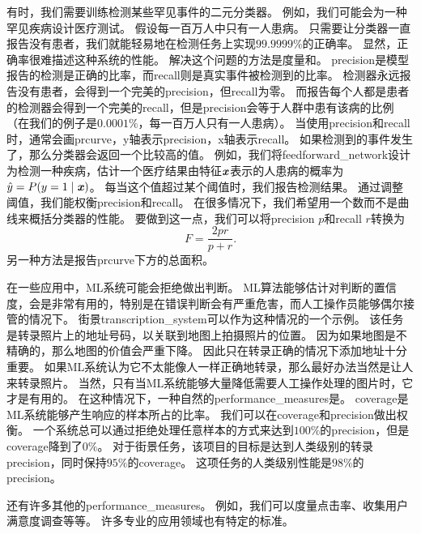 有时，我们需要训练检测某些罕见事件的二元分类器。
例如，我们可能会为一种罕见疾病设计医疗测试。
假设每一百万人中只有一人患病。
只需要让分类器一直报告没有患者，我们就能轻易地在检测任务上实现$99.9999\%$的正确率。
显然，正确率很难描述这种系统的性能。
解决这个问题的方法是度量和。
\gls{precision}是模型报告的检测是正确的比率，而\gls{recall}则是真实事件被检测到的比率。
检测器永远报告没有患者，会得到一个完美的\gls{precision}，但\gls{recall}为零。
而报告每个人都是患者的检测器会得到一个完美的\gls{recall}，但是\gls{precision}会等于人群中患有该病的比例（在我们的例子是$0.0001\%$，每一百万人只有一人患病）。
当使用\gls{precision}和\gls{recall}时，通常会画\gls{prcurve}，y轴表示\gls{precision}，x轴表示\gls{recall}。
如果检测到的事件发生了，那么分类器会返回一个比较高的值。
例如，我们将\gls{feedforward_network}设计为检测一种疾病，估计一个医疗结果由特征$\boldsymbol{\mathit{x}}$表示的人患病的概率为$\hat{y} = P(y=1\mid\boldsymbol{\mathit{x}})$。
每当这个值超过某个阈值时，我们报告检测结果。
通过调整阈值，我们能权衡\gls{precision}和\gls{recall}。
在很多情况下，我们希望用一个数而不是曲线来概括分类器的性能。
要做到这一点，我们可以将\gls{precision} $p$和\gls{recall} $r$转换为
\begin{equation}
	F = \frac{2pr}{p+r}.
\end{equation}
另一种方法是报告\gls{prcurve}下方的总面积。


在一些应用中，\gls{ML}系统可能会拒绝做出判断。
\gls{ML}算法能够估计对判断的置信度，会是非常有用的，特别是在错误判断会有严重危害，而人工操作员能够偶尔接管的情况下。
街景\gls{transcription_system}可以作为这种情况的一个示例。
该任务是转录照片上的地址号码，以关联到地图上拍摄照片的位置。%
因为如果地图是不精确的，那么地图的价值会严重下降。
因此只在转录正确的情况下添加地址十分重要。
如果\gls{ML}系统认为它不太能像人一样正确地转录，那么最好办法当然是让人来转录照片。
当然，只有当\gls{ML}系统能够大量降低需要人工操作处理的图片时，它才是有用的。
在这种情况下，一种自然的\gls{performance_measures}是。
\gls{coverage}是\gls{ML}系统能够产生响应的样本所占的比率。
我们可以在\gls{coverage}和\gls{precision}做出权衡。
一个系统总可以通过拒绝处理任意样本的方式来达到$100\%$的\gls{precision}，但是\gls{coverage}降到了$0\%$。
对于街景任务，该项目的目标是达到人类级别的转录\gls{precision}，同时保持$95\%$的\gls{coverage}。
这项任务的人类级别性能是$98\%$的\gls{precision}。

还有许多其他的\gls{performance_measures}。
例如，我们可以度量点击率、收集用户满意度调查等等。
许多专业的应用领域也有特定的标准。

